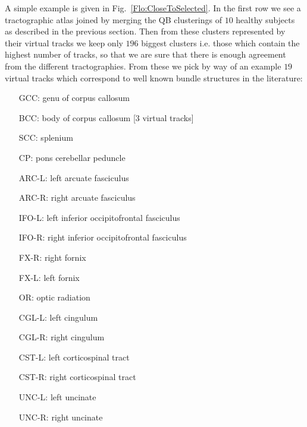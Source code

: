\documentclass[preprint,authoryear,a4paper,10pt,onecolumn]{elsarticle}
\begin{document}
A simple example is given in Fig.~\ref{Flo:CloseToSelected}. In the
first row we see a tractographic atlas joined by merging the QB
clusterings of $10$ healthy subjects as described in the previous
section. Then from these clusters represented by their virtual tracks we
keep only $196$ biggest clusters i.e. those which contain the highest
number of tracks, so that we are sure that there is enough agreement
from the different tractographies. From these we pick by way of an
example $19$ virtual tracks which correspond to well known bundle
structures in the literature:
\begin{itemize} 
\item[GCC:] genu of corpus callosum
\item[BCC:] body of corpus callosum [3 virtual tracks] 
\item[SCC:] splenium
\item[CP:] pons cerebellar peduncle 
\item[ARC-L:] left arcuate fasciculus 
\item[ARC-R:] right arcuate fasciculus 
\item[IFO-L:] left inferior occipitofrontal fasciculus 
\item[IFO-R:] right inferior occipitofrontal fasciculus 
\item[FX-R:] right fornix
\item[FX-L:] left fornix 
\item[OR:] optic radiation 
\item[CGL-L:] left cingulum 
\item[CGL-R:] right cingulum 
\item[CST-L:] left corticospinal tract 
\item[CST-R:] right corticospinal tract
\item[UNC-L:] left uncinate 
\item[UNC-R:] right uncinate 
\end{itemize}

\end{document}
